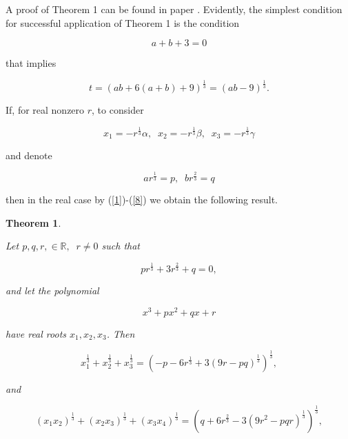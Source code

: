 \documentclass[12pt,oneside,english]{amsart}
\newtheorem{theorem}{Theorem}
\begin{document}
     A proof of Theorem 1 can be found in paper \cite{2}.
Evidently, the simplest condition for successful application of
Theorem 1 is the condition

\newpage

\begin{equation}\label{5}
a+b+3=0
\end{equation}

that implies

\begin{equation}\label{6}
t=(ab+6(a+b)+9)^{\frac 1 3}=(ab-9)^{\frac 1 3}.
\end{equation}

If, for real nonzero $r$, to consider

\begin{equation}\label{7}
x_1=-r^{\frac 1 3}\alpha,\;\;x_2=-r^{\frac 1 3}\beta,\;\;
x_3=-r^{\frac 1 3}\gamma
\end{equation}

and denote

\begin{equation}\label{8}
ar^{\frac 1 3}=p,\;\;br^{\frac 2 3}=q
\end{equation}

then in the real case by (\ref{1})-(\ref{8}) we obtain the following
result.

\begin{theorem}\label{thm2}

\slshape Let $p, q, r, \in\mathbb{R},\;\;r\neq 0$ such that\upshape

\begin{equation}\label{9}
pr^{\frac 1 3}+ 3r^{\frac 2 3}+q=0,
\end{equation}

\slshape and let the polynomial\upshape

\begin{equation}\label{10}
x^3+px^2+qx+r
\end{equation}

\slshape have real roots $x_1, x_2, x_3$. Then\upshape

\begin{equation}\label{11}
x_1^{\frac 1 3}+x_2^{\frac 1 3}+x_3^{\frac 1 3}=(-p-6r^{\frac 1
3}+3(9r-pq)^{\frac 1 3})^{\frac 1 3},
\end{equation}

\slshape and \upshape

\begin{equation}\label{12}
(x_1x_2)^{\frac 1 3}+(x_2x_3)^{\frac 1 3}+(x_3x_4)^{\frac 1
3}=(q+6r^{\frac 2 3}-3(9r^2-pqr)^{\frac 1 3})^{\frac 1 3},
\end{equation}
\end{theorem}
\end{document}
